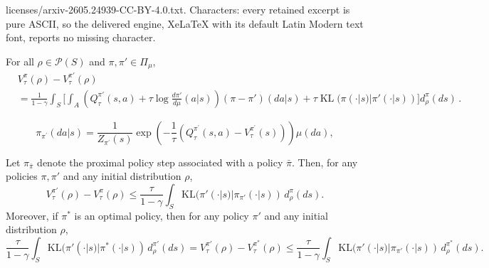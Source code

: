 \documentclass[10pt,a4paper]{amsart}
\begin{document}
licenses/arxiv-2605.24939-CC-BY-4.0.txt. Characters: every retained excerpt is pure ASCII, so the delivered engine, XeLaTeX with its default Latin Modern text font, reports no missing character.
\begin{lemma}
\label{lem:app:mdp:performance_diff}
For all $\rho \in \mathcal{P}(S)$ and $\pi,\pi'\in \Pi_{\mu}$, 
\begin{align*}
&V^{\pi}_\tau(\rho)-V^{\pi'}_\tau(\rho) \\
& = \frac{1}{1-\gamma}\int_S \bigg[\int_A\left(Q^{\pi'}_{\tau}(s,a)+\tau \log \frac{d \pi'}{d\mu}(a|s)\right)(\pi-\pi')(da|s) + \tau    \operatorname{KL}(\pi(\cdot | s)|\pi'(\cdot | s)) \bigg]d^{\pi}_\rho(ds)\,.
\end{align*}
\end{lemma}

\begin{equation}\label{eq:app:mdp:proximal_policy}
\pi_{\pi^{\prime}}(d a | s)=\frac{1}{Z_{\pi^{\prime}}(s)} \exp \left(-\frac{1}{\tau}\left(Q^{\pi^{\prime}}_\tau(s, a)-V^{\pi^{\prime}}_
\tau(s)\right)\right) \mu(d a),
\end{equation}

\begin{lemma}\label{lem:sandwich-inequality}
Let $\pi_{\bar\pi}$ denote the proximal policy step associated with a policy
$\bar\pi$. 
Then, for any policies $\pi,\pi'$ and any initial distribution
$\rho$,
\begin{equation}
V_\tau^{\pi'}(\rho)-V_\tau^\pi(\rho)
\le
\frac{\tau}{1-\gamma}
\int_S
\mathrm{KL}(\pi'(\cdot | s)| \pi_{\pi'}(\cdot |s))
\,d_\rho^\pi(ds).
\label{eq:sandwich-general-bound}
\end{equation}
Moreover, if $\pi^*$ is an optimal policy, then for any policy $\pi'$ and any
initial distribution $\rho$,
\begin{equation}
\frac{\tau}{1-\gamma}
\int_S
\mathrm{KL}(\pi'(\cdot | s)| \pi^*(\cdot | s))
\,d_\rho^{\pi'}(ds)
=
V_\tau^{\pi'}(\rho)-V_\tau^{\pi^*}(\rho)
\le
\frac{\tau}{1-\gamma}
\int_S
\mathrm{KL}(\pi'(\cdot | s)| \pi_{\pi'}(\cdot |s))
\,d_\rho^{\pi^*}(ds).
\label{eq:sandwich-inequality}
\end{equation}
\end{lemma}
\end{document}
